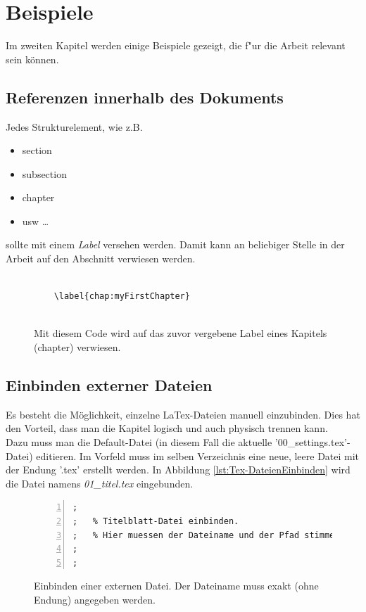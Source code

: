 \chapter{Beispiele}
\label{chap:Beispiele}
Im zweiten Kapitel werden einige Beispiele gezeigt, die f"ur die Arbeit relevant sein können.

\section{Referenzen innerhalb des Dokuments}
Jedes Strukturelement, wie z.B.
\begin{itemize}
\item section
\item subsection
\item chapter
\item usw \dots
\end{itemize}
sollte mit einem \textit{Label} versehen werden. Damit kann an beliebiger Stelle in der Arbeit auf den Abschnitt verwiesen werden.

\FloatBarrier
\begin{figure}[htb]
\begin{lstlisting}[backgroundcolor={\color{white}},
basicstyle={\normalsize\sffamily}]	

	\label{chap:myFirstChapter}
            
\end{lstlisting}
  \caption[Referenzieren auf ein Kapitel (chapter)]{Mit diesem Code wird auf das zuvor vergebene Label eines Kapitels (chapter) verwiesen.}
\label{lst:literaturenquelle}
\end{figure}



\section{Einbinden externer Dateien}
Es besteht die Möglichkeit, einzelne LaTex-Dateien manuell einzubinden. Dies hat den Vorteil, dass man die Kapitel logisch und auch physisch trennen kann.\\

Dazu muss man die Default-Datei (in diesem Fall die aktuelle '00\_settings.tex'-Datei) editieren. Im Vorfeld muss im selben Verzeichnis eine neue, leere Datei mit der Endung '.tex' erstellt werden. In Abbildung \ref{lst:Tex-DateienEinbinden} wird die Datei namens \textit{01\_titel.tex} eingebunden.

\FloatBarrier
\begin{figure}[htb]
\begin{lstlisting}[backgroundcolor={\color{white}},
basicstyle={\normalsize\sffamily},
breaklines=true,
frame={bottomline,topline, rightline},
language=HTML,
numbers=left,
showstringspaces=false,
xleftmargin=22pt]	
;
;	% Titelblatt-Datei einbinden. 
;	% Hier muessen der Dateiname und der Pfad stimmen!
;	
;           
\end{lstlisting}
  \caption[Einbinden einer externen Datei]{Einbinden einer externen Datei. Der Dateiname muss exakt (ohne Endung) angegeben werden.}
\label{lst:extDateieinbinden}
\end{figure}


